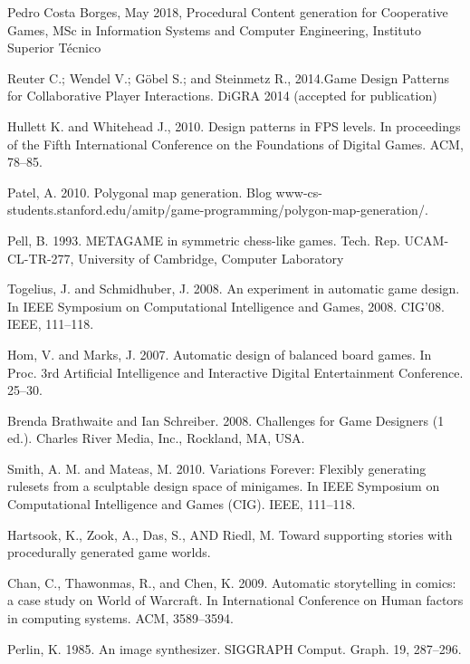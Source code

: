 \documentclass[runningheads]{llncs}
\begin{document}
\begin{thebibliography}{40}
Pedro Costa Borges, May 2018, Procedural Content generation for Cooperative Games, MSc in Information Systems and Computer Engineering, Instituto Superior Técnico



Reuter C.; Wendel V.; Göbel S.; and Steinmetz R., 2014.Game Design Patterns for Collaborative Player Interactions. DiGRA 2014 (accepted for publication)

Hullett K. and Whitehead J., 2010. Design patterns in FPS levels. In proceedings of the Fifth International Conference on the Foundations of Digital
Games. ACM, 78–85.

Patel, A. 2010. Polygonal map generation. Blog www-cs-students.stanford.edu/\texttildelow amitp/game-programming/polygon-map-generation/.

Pell, B. 1993. METAGAME in symmetric chess-like games. Tech. Rep. UCAM-CL-TR-277, University of Cambridge, Computer Laboratory

Togelius, J. and Schmidhuber, J. 2008. An experiment in automatic game design. In IEEE Symposium on Computational Intelligence and Games, 2008. CIG’08. IEEE, 111–118.

Hom, V. and Marks, J. 2007. Automatic design of balanced board games. In Proc. 3rd Artificial Intelligence and Interactive Digital Entertainment Conference. 25–30.

Brenda Brathwaite and Ian Schreiber. 2008. Challenges for Game Designers (1 ed.). Charles River Media, Inc., Rockland, MA, USA.

Smith, A. M. and Mateas, M. 2010. Variations Forever: Flexibly generating rulesets from a sculptable design space of minigames. In IEEE Symposium on Computational Intelligence and Games (CIG). IEEE, 111–118.

Hartsook, K., Zook, A., Das, S., AND Riedl, M. Toward supporting stories with procedurally generated game worlds.

Chan, C., Thawonmas, R., and Chen, K. 2009. Automatic storytelling in comics: a case study on World of Warcraft. In International Conference on Human factors in computing systems. ACM, 3589–3594.

Perlin, K. 1985. An image synthesizer. SIGGRAPH Comput. Graph. 19, 287–296.


\end{thebibliography}
\end{document}
